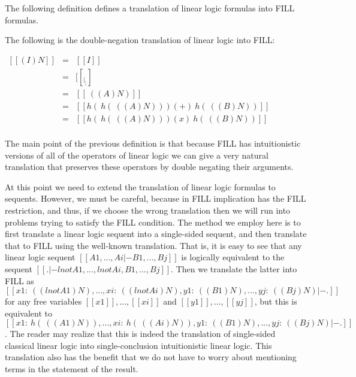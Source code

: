 The following definition defines a translation of linear logic formulas into FILL formulas.
\begin{definition}
  \label{def:ll-to-fill}
  The following is the double-negation translation of linear logic
  into FILL:
  \begin{center}
  \begin{math}
    \begin{array}{lll}
      [[(I)N]] & = & [[I]]\\
      [[(_|_)N]] & = & [[_|_]]\\
      [[(lnot A)N]] & = & [[~((A)N)]]\\
      [[(A (+) B)N]] & = & [[h(~h(~((A)N))) (+) ~h(~((B)N))]]\\
      [[(A (x) B)N]] & = & [[h(~h(~((A)N))) (x) ~h(~((B)N))]]\\
    \end{array}
  \end{math}
\end{center}
\end{definition}
\noindent
The main point of the previous definition is that because FILL has
intuitionistic versions of all of the operators of linear logic we can
give a very natural translation that preserves these operators by
double negating their arguments.  

At this point we need to extend the translation of linear logic
formulas to sequents.  However, we must be careful, because in FILL
implication has the FILL restriction, and thus, if we choose the wrong
translation then we will run into problems trying to satisfy the FILL
condition.  The method we employ here is to first translate a linear
logic sequent into a single-sided sequent, and then translate that to
FILL using the well-known translation.  That is, it is easy to see
that any linear logic sequent $[[A1,...,Ai |- B1,...,Bj]]$ is
logically equivalent to the sequent $[[. |- lnot A1,...,lnot
    Ai,B1,...,Bj]]$.  Then we translate the latter into FILL as $[[x1
    : ~((lnot A1)N),...,xi : ~((lnot Ai)N),y1 : ~((B1)N),...,yj :
    ~((Bj)N) |- .]]$ for any free variables $[[x1]],\ldots,[[xi]]$ and
$[[y1]],\ldots,[[yj]]$, but this is equivalent to $[[x1 :
    ~h(~((A1)N)),...,xi : ~h(~((Ai)N)),y1 : ~((B1)N),...,yj :~((Bj)N)
    |- .]]$.  The reader may realize that this is indeed the
translation of single-sided classical linear logic into
single-conclusion intuitionistic linear logic.  This translation also
has the benefit that we do not have to worry about mentioning terms in
the statement of the result.

